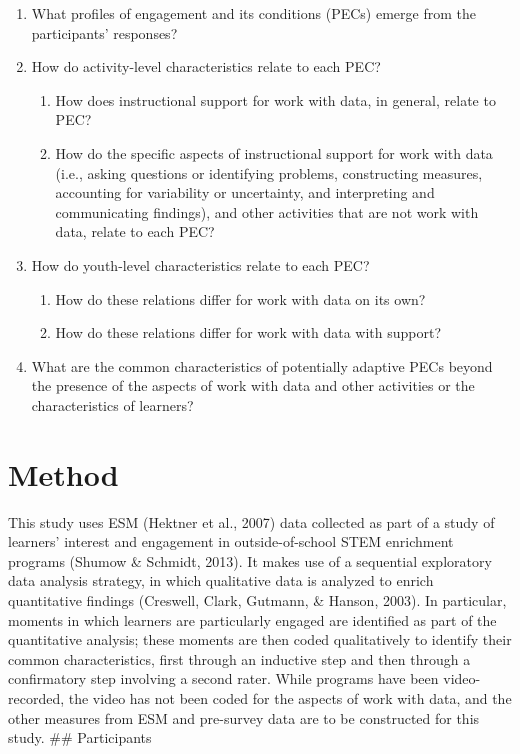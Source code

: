 \documentclass[]{msu-thesis}
\providecommand{\tightlist}{%
  \setlength{\itemsep}{0pt}\setlength{\parskip}{0pt}}
\theoremstyle{definition}
\theoremstyle{definition}
\theoremstyle{definition}
\theoremstyle{remark}
\begin{document}
\begin{enumerate}
\def\labelenumi{\arabic{enumi}.}
\tightlist
\item
  What profiles of engagement and its conditions (PECs) emerge from the
  participants' responses?
\item
  How do activity-level characteristics relate to each PEC?

  \begin{enumerate}
  \def\labelenumii{\arabic{enumii}.}
  \tightlist
  \item
    How does instructional support for work with data, in general,
    relate to PEC?
  \item
    How do the specific aspects of instructional support for work with
    data (i.e., asking questions or identifying problems, constructing
    measures, accounting for variability or uncertainty, and
    interpreting and communicating findings), and other activities that
    are not work with data, relate to each PEC?
  \end{enumerate}
\item
  How do youth-level characteristics relate to each PEC?

  \begin{enumerate}
  \def\labelenumii{\arabic{enumii}.}
  \tightlist
  \item
    How do these relations differ for work with data on its own?
  \item
    How do these relations differ for work with data with support?
  \end{enumerate}
\item
  What are the common characteristics of potentially adaptive PECs
  beyond the presence of the aspects of work with data and other
  activities or the characteristics of learners?
\end{enumerate}

\chapter{Method}\label{method}

This study uses ESM (Hektner et al., 2007) data collected as part of a
study of learners' interest and engagement in outside-of-school STEM
enrichment programs (Shumow \& Schmidt, 2013). It makes use of a
sequential exploratory data analysis strategy, in which qualitative data
is analyzed to enrich quantitative findings (Creswell, Clark, Gutmann,
\& Hanson, 2003). In particular, moments in which learners are
particularly engaged are identified as part of the quantitative
analysis; these moments are then coded qualitatively to identify their
common characteristics, first through an inductive step and then through
a confirmatory step involving a second rater. While programs have been
video-recorded, the video has not been coded for the aspects of work
with data, and the other measures from ESM and pre-survey data are to be
constructed for this study. \#\# Participants
\end{document}
